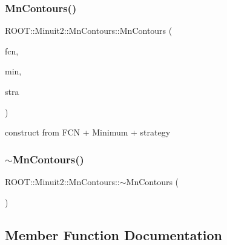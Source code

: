 \subsubsection{\texorpdfstring{MnContours()}{MnContours()}\hspace{0.1cm}{\footnotesize\ttfamily [9/9]}}
{\footnotesize\ttfamily R\+O\+O\+T\+::\+Minuit2\+::\+Mn\+Contours\+::\+Mn\+Contours (\begin{DoxyParamCaption}\item[{const \mbox{\hyperlink{classROOT_1_1Minuit2_1_1FCNBase}{F\+C\+N\+Base}} \&}]{fcn,  }\item[{const \mbox{\hyperlink{classROOT_1_1Minuit2_1_1FunctionMinimum}{Function\+Minimum}} \&}]{min,  }\item[{const \mbox{\hyperlink{classROOT_1_1Minuit2_1_1MnStrategy}{Mn\+Strategy}} \&}]{stra }\end{DoxyParamCaption})\hspace{0.3cm}{\ttfamily [inline]}}



construct from F\+CN + Minimum + strategy 

\mbox{\label{classROOT_1_1Minuit2_1_1MnContours_a0764759095adb2129ae9282024af472a}} 
\subsubsection{\texorpdfstring{$\sim$MnContours()}{~MnContours()}\hspace{0.1cm}{\footnotesize\ttfamily [3/3]}}
{\footnotesize\ttfamily R\+O\+O\+T\+::\+Minuit2\+::\+Mn\+Contours\+::$\sim$\+Mn\+Contours (\begin{DoxyParamCaption}{ }\end{DoxyParamCaption})\hspace{0.3cm}{\ttfamily [inline]}}



\subsection{Member Function Documentation}
\mbox{\label{classROOT_1_1Minuit2_1_1MnContours_a8bcd5be6a72acc39c1b56fd45e9958ba}} 

